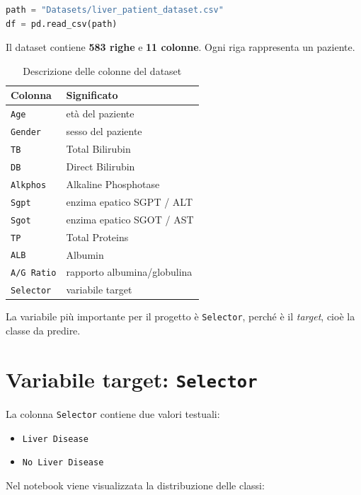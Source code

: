\documentclass[11pt,a4paper]{article}
\begin{document}
\begin{lstlisting}[language=Python]
path = "Datasets/liver_patient_dataset.csv"
df = pd.read_csv(path)
\end{lstlisting}

Il dataset contiene \textbf{583 righe} e \textbf{11 colonne}. Ogni riga rappresenta un paziente.

\begin{table}[H]
\centering
\caption{Descrizione delle colonne del dataset}
\label{tab:dataset_columns}
\begin{tabular}{>{\raggedright\arraybackslash}p{3cm}>{\raggedright\arraybackslash}p{6cm}}
\toprule
\textbf{Colonna} & \textbf{Significato} \\
\midrule
\texttt{Age} & età del paziente \\
\texttt{Gender} & sesso del paziente \\
\texttt{TB} & Total Bilirubin \\
\texttt{DB} & Direct Bilirubin \\
\texttt{Alkphos} & Alkaline Phosphotase \\
\texttt{Sgpt} & enzima epatico SGPT / ALT \\
\texttt{Sgot} & enzima epatico SGOT / AST \\
\texttt{TP} & Total Proteins \\
\texttt{ALB} & Albumin \\
\texttt{A/G Ratio} & rapporto albumina/globulina \\
\texttt{Selector} & variabile target \\
\bottomrule
\end{tabular}
\end{table}

La variabile più importante per il progetto è \texttt{Selector}, perché è il \textit{target}, cioè la classe da predire.

\section{Variabile target: \texttt{Selector}}
La colonna \texttt{Selector} contiene due valori testuali:
\begin{itemize}
    \item \texttt{Liver Disease}
    \item \texttt{No Liver Disease}
\end{itemize}

Nel notebook viene visualizzata la distribuzione delle classi:
\end{document}
